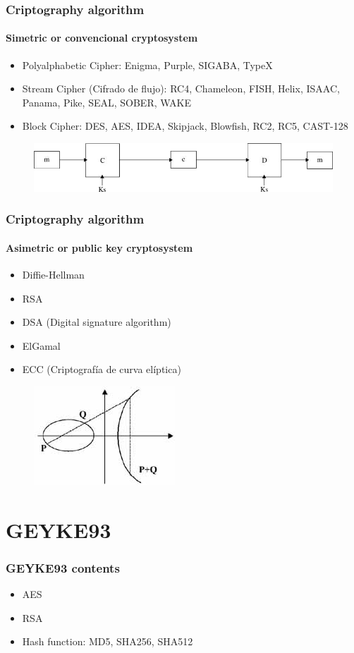 \documentclass{beamer}
\begin{document}
\begin{frame}
\frametitle{Criptography algorithm}
\framesubtitle{Simetric or convencional cryptosystem}
\begin{itemize}
\item Polyalphabetic Cipher: Enigma, Purple, SIGABA, TypeX
\item Stream Cipher (Cifrado de flujo): RC4, Chameleon, FISH, Helix, ISAAC, Panama, Pike, SEAL, SOBER, WAKE
\item Block Cipher: DES, AES, IDEA, Skipjack, Blowfish, RC2, RC5, CAST-128
\end{itemize}
\begin{figure}
\includegraphics[width=0.8\linewidth]{cp.png}
\end{figure}
\end{frame}


\begin{frame}
\frametitle{Criptography algorithm}
\framesubtitle{Asimetric or public key cryptosystem}
\begin{itemize}
\item Diffie-Hellman
\item RSA
\item DSA (Digital signature algorithm)
\item ElGamal
\item ECC (Criptografía de curva elíptica)
\end{itemize}
\begin{figure}
\includegraphics[width=0.4\linewidth]{ecc.png}
\end{figure}
\end{frame}

\section{GEYKE93}
\begin{frame}
\frametitle{GEYKE93 contents}
\begin{itemize}
\item AES
\item RSA
\item Hash function: MD5, SHA256, SHA512
\end{itemize}
\end{frame}
\end{document}
